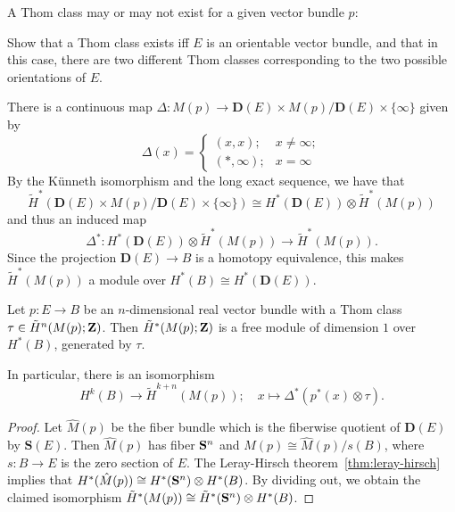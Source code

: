 \documentclass[a4paper,openany]{scrbook}
\begin{document}
A Thom class may or may not exist for a given vector bundle $p$:

\begin{exer}
Show that a Thom class exists iff $E$ is an orientable vector bundle, and that in this case, there are two different Thom classes corresponding to the two possible orientations of $E$.
\end{exer}

There is a continuous map $\Delta\colon M(p) \to \mathbf D(E) \times M(p)/\mathbf D(E) \times \{\infty\}$ given by
\[
\Delta(x) = \begin{cases} (x,x); & x \neq \infty;\\
(*,\infty); & x = \infty
\end{cases}
\]
By the K\"unneth isomorphism
 and the long exact sequence, we have that
\[
\tilde H^*(\mathbf D(E) \times M(p)/\mathbf D(E) \times \{\infty\}) \cong H^*(\mathbf D(E)) \otimes \tilde H^*(M(p))
\]
and thus an induced map
\[
\Delta^*\colon H^*(\mathbf D(E)) \otimes \tilde H^*(M(p)) \to \tilde H^*(M(p)).
\]
Since the projection $\mathbf D(E) \to B$ is a homotopy equivalence, this makes $\tilde H^*(M(p))$ a module over $H^*(B) \cong H^*(\mathbf D(E))$.

\begin{thm} \label{thm:thomiso}
Let $p\colon E \to B$ be an $n$-dimensional real vector bundle with a Thom class $\tau \in \tilde H^n(M(p);\Z)$. Then $\tilde H^*(M(p);\Z)$ is a free module of dimension $1$ over $H^*(B)$, generated by $\tau$.

In particular, there is an isomorphism
\[
H^k(B) \to \tilde H^{k+n}(M(p)); \quad x \mapsto \Delta^*(p^*(x) \otimes \tau).
\]
\end{thm}
\begin{proof}
Let $\hat M(p)$ be the fiber bundle which is the fiberwise quotient of $\mathbf D(E)$ by $\mathbf S(E)$. Then $\hat M(p)$ has fiber $\S^n$ and $M(p) \cong \hat M(p)/s(B)$, where $s\colon B \to E$ is the zero section of $E$.
The Leray-Hirsch theorem~\ref{thm:leray-hirsch} implies that $H^*(\hat M(p)) \cong H^*(\S^n) \otimes H^*(B)$. By dividing out, we obtain the claimed isomorphism $\tilde H^*(M(p)) \cong \tilde H^*(\S^n) \otimes H^*(B)$.
\end{proof}
\end{document}
